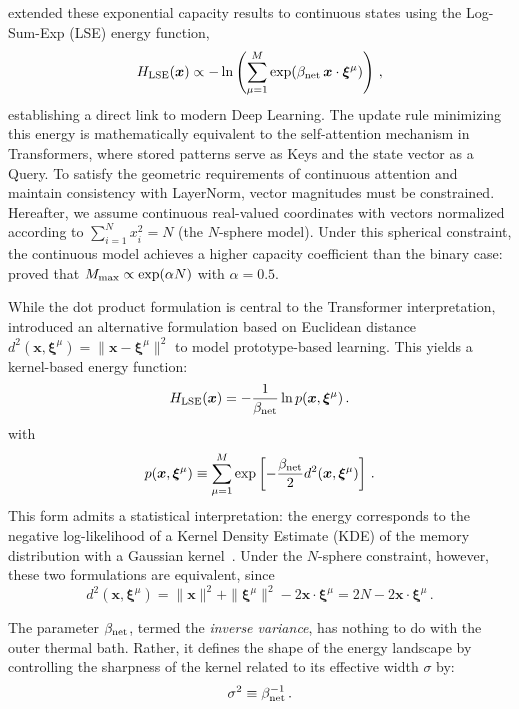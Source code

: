 \documentclass{article}
\theoremstyle{plain}
\theoremstyle{definition}
\theoremstyle{remark}
\begin{document}
\citet{ramsauer2021hopfield} extended these exponential capacity results to continuous states using the Log-Sum-Exp (LSE) energy function, 
\begin{equation}
    H_{\rm LSE}(\bm{x}) \propto -\ln \left( \sum_{\mu=1}^M \exp(\beta_{\rm net} \, \bm{x} \cdot \bm{\xi}^\mu) \right) \,,
    \label{eq:lse_energy}
\end{equation}
establishing a direct link to modern Deep Learning.
The update rule minimizing this energy is mathematically equivalent to the self-attention mechanism in Transformers, where stored patterns serve as Keys and the state vector as a Query. To satisfy the geometric requirements of continuous attention and maintain consistency with LayerNorm, vector magnitudes must be constrained. Hereafter, we assume continuous real-valued coordinates with vectors normalized according to $\sum_{i=1}^{N} x_i^2 = N$ (the $N$-sphere model). Under this spherical constraint, the continuous model achieves a higher capacity coefficient than the binary case: \citet{ramsauer2021hopfield} proved that $M_{\rm max} \propto \exp(\alpha N)$ with $\alpha = 0.5$.

While the dot product formulation is central to the Transformer interpretation, \citet{krotov2021large} introduced an alternative formulation based on Euclidean distance $d^2(\bm{x}, \bm{\xi}^\mu) = \|\bm{x}-\bm{\xi}^\mu\|^2$ to model prototype-based learning. This yields a kernel-based energy function:
\begin{equation}
    H_{\rm LSE}(\bm{x}) = -\frac{1}{\beta_{\rm net}} \ln p(\bm{x}, \bm{\xi}^\mu) \,.
    \label{eq:H_lse}
\end{equation}
with 
\begin{equation}
    p(\bm{x}, \bm{\xi}^\mu) \equiv \sum_{\mu=1}^M \exp\left[ - \frac{\beta_{\rm net}}{2} d^2(\bm{x}, \bm{\xi}^\mu) \right] \,.
    \label{eq:dens}
\end{equation}
This form admits a statistical interpretation: the energy corresponds to the negative log-likelihood of a Kernel Density Estimate (KDE) of the memory distribution with a Gaussian kernel~\cite{hoover2025dense}. Under the $N$-sphere constraint, however, these two formulations are  equivalent, since 
\begin{equation}
    d^2(\bm{x}, \bm{\xi}^\mu) = \|\bm{x}\|^2 + \|\bm{\xi}^\mu\|^2 - 2\bm{x} \cdot \bm{\xi}^\mu = 2N - 2\bm{x} \cdot \bm{\xi}^\mu \,.
    \label{eq:edist}
\end{equation}

The parameter $\beta_{\rm net}$, termed the {\it inverse variance}, has nothing to do with the outer thermal bath. Rather, it defines the shape of the energy landscape by controlling the sharpness of the kernel related to its effective width $\sigma$ by:
\begin{equation}
    \sigma^2 \equiv \beta_{\rm net}^{-1} \,.
\end{equation}
\end{document}
